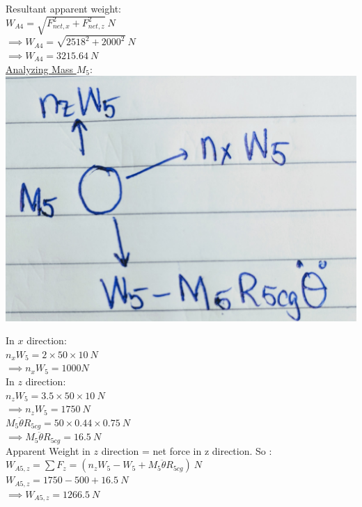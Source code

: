 \documentclass{article}
\begin{document}
\noindent Resultant apparent weight: \\
$W_{A4}= \sqrt{F_{net,x}^2+ F_{net,z}^2}\ N$\\
$\implies W_{A4}= \sqrt{2518^2+ 2000^2}\ N$\\
$\implies W_{A4}= 3215.64\ N$\\

\noindent \underline{Analyzing Mass $M_5$}:\\

\includegraphics[scale=0.05]{m5.jpg}

\noindent In $x$ direction:\\

\noindent $n_xW_5 = 2 \times 50 \times 10\ N$\\
$\implies n_xW_5= 1000 N $\\

\noindent In $z$ direction: \\

\noindent $n_zW_5= 3.5 \times 50 \times 10\ N$\\
$\implies n_zW_5 = 1750\ N$\\

\noindent $M_5\ddot{\theta}R_{5cg}=50 \times 0.44 \times 0.75\ N $\\
$\implies M_5\ddot{\theta}R_{5cg}= 16.5\ N $\\

\noindent Apparent Weight in $z$ direction = net force in z direction. So : \\
$W_{A5,z}=\sum F_z = (n_zW_5-W_5+ M_5\ddot{\theta}R_{5cg})\ N$\\
$W_{A5,z}= 1750-500+16.5 \ N$\\
$\implies W_{A5,z}= 1266.5\ N$\\
\end{document}
